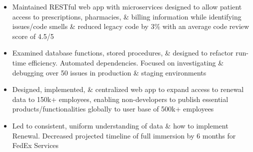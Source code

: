 \documentclass[10pt,a4paper,ragged2e]{altacv}
\begin{document}
\divider \newline
{}
\begin{itemize}
\item {Maintained RESTful web app with microservices designed to allow patient access to prescriptions, pharmacies, \& billing information while identifying issues/code smells \& reduced legacy code by 3\% with an average code review score of 4.5/5}


\item{Examined database functions, stored procedures, \& designed to refactor run-time efficiency. Automated dependencies. Focused on investigating \& debugging over 50 issues in production \& staging environments}
\end{itemize}

\divider \newline
{}
\begin{itemize}
\item {Designed, implemented, \& centralized web app to expand access to renewal data to 150k+ employees, enabling non-developers to publish essential products/functionalities globally to user base of 500k+ employees}

\item{Led to consistent, uniform understanding of data \& how to implement Renewal. Decreased projected timeline of full immersion by 6 months for FedEx Services}

\end{itemize}


\end{document}
